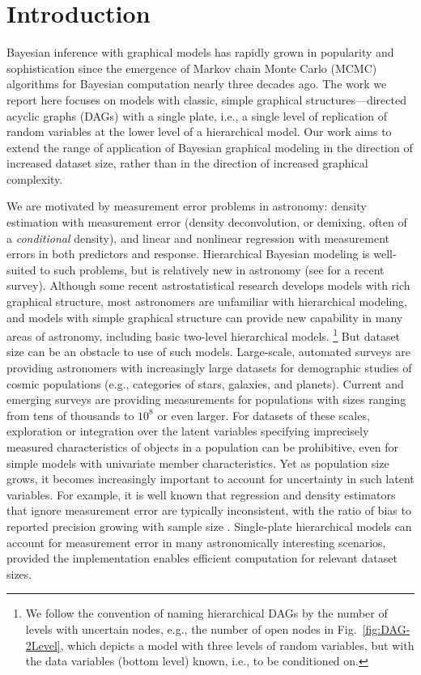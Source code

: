 \section{Introduction}
\label{sec:intro}

Bayesian inference with graphical models has rapidly grown in popularity and sophistication since the emergence of Markov chain Monte Carlo (MCMC) algorithms for Bayesian computation nearly three decades ago.
The work we report here focuses on models with classic, simple graphical structures---directed acyclic graphs (DAGs) with a single plate, i.e., a single level of replication of random variables at the lower level of a hierarchical model.
Our work aims to extend the range of application of Bayesian graphical modeling in the direction of increased dataset size, rather than in the direction of increased graphical complexity.

We are motivated by measurement error problems in astronomy: density estimation with measurement error (density deconvolution, or demixing, often of a \emph{conditional} density), and linear and nonlinear regression with measurement errors in both predictors and response.
Hierarchical Bayesian modeling is well-suited to such problems, but is relatively new in astronomy (see \citealt{loredo2013survey} for a recent survey).
Although some recent astrostatistical research develops models with rich graphical structure, most astronomers are unfamiliar with hierarchical modeling, and models with simple graphical structure can provide new capability in many areas of astronomy, including basic two-level hierarchical models.%
\footnote{We follow the convention of naming hierarchical DAGs by the number of levels with uncertain nodes, e.g., the number of open nodes in Fig.~\ref{fig:DAG-2Level}, which depicts a model with three levels of random variables, but with the data variables (bottom level) known, i.e., to be conditioned on.}
But dataset size can be an obstacle to use of such models.
Large-scale, automated surveys are providing astronomers with increasingly large datasets for demographic studies of cosmic populations (e.g., categories of stars, galaxies, and planets).
Current and emerging surveys are providing measurements for populations with sizes ranging from tens of thousands to $10^8$ or even larger.
For datasets of these scales, exploration or integration over the latent variables specifying imprecisely measured characteristics of objects in a population can be prohibitive, even for simple models with univariate member characteristics.
Yet as population size grows, it becomes increasingly important to account for uncertainty in such latent variables.
For example, it is well known that regression and density estimators that ignore measurement error are typically inconsistent, with the ratio of bias to reported precision growing with sample size \citep{C+06-MsmtErr}.
Single-plate hierarchical models can account for measurement error in many astronomically interesting scenarios, provided the implementation enables efficient computation for relevant dataset sizes.

